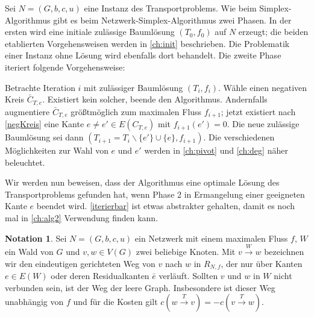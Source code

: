\documentclass[a4paper,twoside,ngerman]{report}
\theoremstyle{plain}
\theoremstyle{definition}
\newtheorem*{nota}{Notation}
\begin{document}
Sei $N=(G,b,c,u)$ eine Instanz des Transportproblems. Wie beim Simplex-Algorithmus gibt es beim Netzwerk-Simplex-Algorithmus zwei Phasen. In der ersten wird eine initiale zulässige Baumlösung $(T_0,f_0)$ auf $N$ erzeugt; die beiden etablierten Vorgehensweisen werden in \cref{ch:init} beschrieben. Die Problematik einer Instanz ohne Lösung wird ebenfalls dort behandelt. Die zweite Phase iteriert folgende Vorgehensweise:

Betrachte Iteration $i$ mit zulässiger Baumlösung $(T_i,f_i)$. Wähle einen negativen Kreis $\bar{C}_{T,e}$. Existiert kein solcher, beende den Algorithmus. Andernfalls augmentiere $\bar{C}_{T,e}$ größtmöglich zum maximalen Fluss $f_{i+1}$; jetzt existiert nach \cref{negKreis} eine Kante $e\neq e'\in E(C_{T,e})$ mit $f_{i+1}(e')=0$. Die neue zulässige Baumlösung sei dann $(T_{i+1}=T_i\backslash\{e'\}\cup\{e\},f_{i+1})$. Die verschiedenen Möglichkeiten zur Wahl von $e$ und $e'$ werden in \cref{ch:pivot} und \cref{ch:deg} näher beleuchtet.

Wir werden nun beweisen, dass der Algorithmus eine optimale Lösung des Transportproblems gefunden hat, wenn Phase 2 in Ermangelung einer geeigneten Kante $e$ beendet wird. \cref{iterierbar} ist etwas abstrakter gehalten, damit es noch mal in \cref{ch:alg2} Verwendung finden kann.

\begin{nota}Sei $N=(G,b,c,u)$ ein Netzwerk mit einem maximalen Fluss $f$, $W$ ein Wald von $G$ und $v,w\in V(G)$ zwei beliebige Knoten. Mit $v\xrightarrow{W}w$ bezeichnen wir den eindeutigen gerichteten Weg von $v$ nach $w$ in $R_{N,f}$, der nur über Kanten $e\in E(W)$ oder deren Residualkanten $\bar{e}$ verläuft. Sollten $v$ und $w$ in $W$ nicht verbunden sein, ist der Weg der leere Graph. Insbesondere ist dieser Weg unabhängig von $f$ und für die Kosten gilt $c(w\xrightarrow{T}v) = -c(v\xrightarrow{T}w)$.\end{nota}
\end{document}
